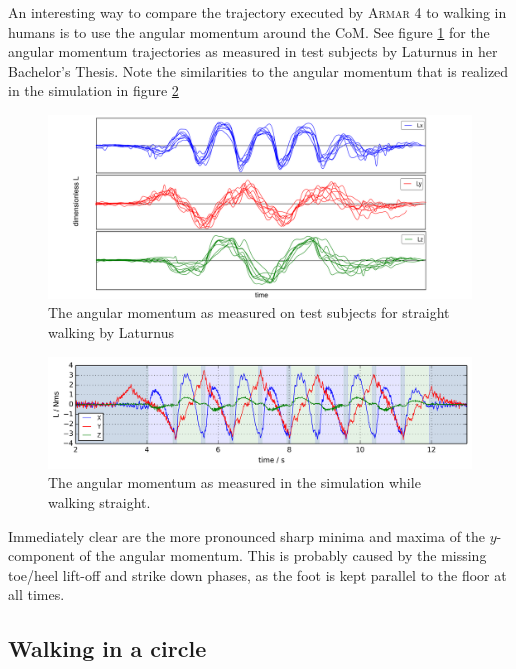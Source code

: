 \documentclass[english,ngerman]{KITreprt}
\newcommand{\name}[1]{\textsc{#1}}
\begin{document}
An interesting way to compare the trajectory executed by \name{Armar 4}
to walking in humans is to use the angular momentum around the CoM. See
figure \ref{img:sophie-angular-momentum} for the angular momentum
trajectories as measured in test subjects by Laturnus
\cite{laturnus2014} in her Bachelor's Thesis. Note the similarities to
the angular momentum that is realized in the simulation in figure
\ref{img:angular-momentum}

\begin{figure}[H]
\vspace*{-1em}
\includegraphics[width=\textwidth,resolution=300]{images/sophie_angular_momentum.png}
\caption{The angular momentum as measured on test subjects for straight walking by Laturnus \cite{laturnus2014}}
\label{img:sophie-angular-momentum}
\end{figure}

\begin{figure}[H]
\vspace*{-1em}
\includegraphics[width=\textwidth,resolution=300]{images/angular_momentum.png}
\caption{The angular momentum as measured in the simulation while walking straight.}
\label{img:angular-momentum}
\end{figure}

Immediately clear are the more pronounced sharp minima and maxima of the
$y$-component of the angular momentum. This is probably caused by the
missing toe/heel lift-off and strike down phases, as the foot is kept
parallel to the floor at all times.

\subsection{Walking in a circle}\label{walking-in-a-circle}
\end{document}

